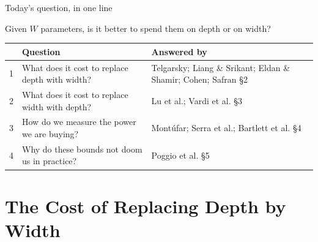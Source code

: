 \documentclass[aspectratio=169, 11pt]{beamer}
\begin{document}
\begin{frame}{Today's question, in one line}
  \vspace{-0.05em}
  \begin{center}
    {\large Given $W$ parameters, is it better to spend them on
    \alert{depth} or on \alert{width}?}
  \end{center}
  \vspace{0.15em}
  \centering
  \renewcommand{\arraystretch}{1.35}
  {\small
  \begin{tabular}{p{} p{}
                  p{}}
    & \textbf{Question} & \textbf{Answered by}\\
    \hline
    1 & What does it cost to replace depth with width?
      & Telgarsky; Liang \& Srikant; Eldan \& Shamir; Cohen;
        Safran \hfill{\scriptsize \S2}\\
    2 & What does it cost to replace width with depth?
      & Lu et al.; Vardi et al. \hfill{\scriptsize \S3}\\
    3 & How do we measure the power we are buying?
      & Mont\'ufar; Serra et al.; Bartlett et al.
        \hfill{\scriptsize \S4}\\
    4 & Why do these bounds not doom us in practice?
      & Poggio et al. \hfill{\scriptsize \S5}\\
    \hline
  \end{tabular}}
\end{frame}

\section{The Cost of Replacing Depth by Width}
\end{document}
